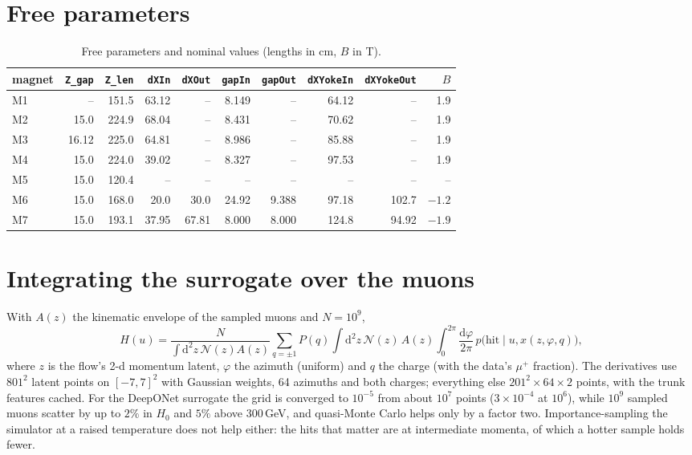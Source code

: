 \documentclass[11pt,a4paper]{article}
\begin{document}
\section{Free parameters}
\begin{table}[h]
\centering
\caption{Free parameters and nominal values (lengths in cm, $B$ in T).}
\label{tab:params}
\small
\begin{tabular}{lrrrrrrrrr}
\toprule
magnet & \texttt{Z\_gap} & \texttt{Z\_len} & \texttt{dXIn} & \texttt{dXOut} & \texttt{gapIn} & \texttt{gapOut} & \texttt{dXYokeIn} & \texttt{dXYokeOut} & $B$ \\
\midrule
M1 &  --   & 151.5 & 63.12 & --    & 8.149 & --    & 64.12 & --     & 1.9 \\
M2 & 15.0  & 224.9 & 68.04 & --    & 8.431 & --    & 70.62 & --     & 1.9 \\
M3 & 16.12 & 225.0 & 64.81 & --    & 8.986 & --    & 85.88 & --     & 1.9 \\
M4 & 15.0  & 224.0 & 39.02 & --    & 8.327 & --    & 97.53 & --     & 1.9 \\
M5 & 15.0  & 120.4 & --    & --    & --    & --    & --    & --     & -- \\
M6 & 15.0  & 168.0 & 20.0  & 30.0  & 24.92 & 9.388 & 97.18 & 102.7  & $-1.2$ \\
M7 & 15.0  & 193.1 & 37.95 & 67.81 & 8.000 & 8.000 & 124.8 & 94.92  & $-1.9$ \\
\bottomrule
\end{tabular}
\end{table}

\section{Integrating the surrogate over the muons}
\label{app:quadrature}

With $A(z)$ the kinematic envelope of the sampled muons and $N=10^9$,
\begin{equation}
  H(u) = \frac{N}{\int\!\mathrm{d}^2z\,\mathcal{N}(z)A(z)}\sum_{q=\pm1}P(q)\int\!\mathrm{d}^2z\,
  \mathcal{N}(z)\,A(z)\int_0^{2\pi}\!\frac{\mathrm{d}\varphi}{2\pi}\,p\big(\text{hit}\mid u, x(z,\varphi,q)\big),
\end{equation}
where $z$ is the flow's 2-d momentum latent, $\varphi$ the azimuth (uniform) and $q$ the charge
(with the data's $\mu^+$ fraction). The derivatives use $801^2$ latent points on $[-7,7]^2$ with
Gaussian weights, 64 azimuths and both charges; everything else $201^2\times64\times2$ points, with
the trunk features cached. For the DeepONet surrogate the grid is converged to $10^{-5}$ from about $10^7$ points ($3\times10^{-4}$ at $10^6$), while
$10^9$ sampled muons scatter by up to $2\%$ in $H_0$ and $5\%$ above $300$\,GeV, and quasi-Monte
Carlo helps only by a factor two. Importance-sampling the simulator
at a raised temperature does not help either: the hits that matter are at intermediate momenta,
of which a hotter sample holds fewer.
\end{document}
